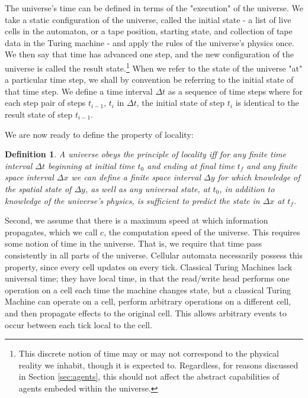 \documentclass[12pt]{article}
\newtheorem{defn}{Definition}
\begin{document}

The universe's time can be defined in terms of the "execution" of the universe.
We take a static configuration of the universe, called the initial state - a
list of live cells in the automaton, or a tape position, starting state, and
collection of tape data in the Turing machine - and apply the rules of the
universe's physics once. We then say that time has advanced one step, and the
new configuration of the universe is called the result state.\footnote{This
discrete notion of time may or may not correspond to the physical reality we
inhabit, though it is expected to. Regardless, for reasons discussed in Section
\ref{sec:agents}, this should not affect the abstract capabilities of agents
embeded within the universe.} When we refer to the state of the universe "at" a
particular time step, we shall by convention be referring to the initial state
of that time step. We define a time interval \(\Delta t\) as a sequence of time
steps where for each step pair of steps \(t_{i-1}\), \(t_i\) in \(\Delta t\),
the initial state of step \(t_i\) is identical to the result state of step
\(t_{i-1}\).



We are now ready to define the property of locality:

\begin{defn}

   A universe obeys the principle of \textit{locality} iff for any finite time
   interval \(\Delta t\) beginning at initial time \(t_0\) and ending at final
   time \(t_f\) and any finite space interval \(\Delta x\) we can define a
   finite space interval \(\Delta y\) for which knowledge of the spatial state
   of \(\Delta y\), as well as any universal state, at \(t_0\), in addition to
   knowledge of the universe's physics, is sufficient to predict the state in
   \(\Delta x\) at \(t_f\).

\end{defn}



Second, we assume that there is a maximum speed at which information
propagates, which we call \(c\), the computation speed of the universe. This
requires some notion of time in the universe. That is, we require that time pass
consistently in all parts of the universe. Cellular automata necessarily possess
this property, since every cell updates on every tick. Classical Turing Machines
lack universal time; they have local time, in that the read/write head performs
one operation on a cell each time the machine changes state, but a classical
Turing Machine can operate on a cell, perform arbitrary operations on a
different cell, and then propagate effects to the original cell. This allows
arbitrary events to occur between each tick local to the cell.
\end{document}
